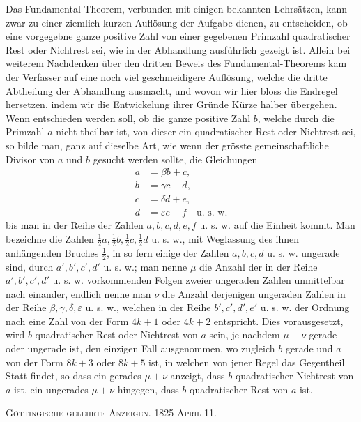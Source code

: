 \documentclass[12pt]{article}
\begin{document}
Das Fundamental-Theorem, verbunden mit einigen bekannten Lehrsätzen, kann zwar zu einer ziemlich kurzen Auflösung der Aufgabe dienen, zu entscheiden, ob eine vorgegebne ganze positive Zahl von einer gegebenen Primzahl quadratischer Rest oder Nichtrest sei, wie in der Abhandlung ausführlich gezeigt ist. Allein bei weiterem Nachdenken über den dritten Beweis des Fundamental-Theorems kam der Verfasser auf eine noch viel geschmeidigere Auflösung, welche die dritte Abtheilung der Abhandlung ausmacht, und wovon wir hier bloss die Endregel hersetzen, indem wir die Entwickelung ihrer Gründe Kürze halber übergehen. Wenn entschieden werden soll, ob die ganze positive Zahl $b$, welche durch die Primzahl $a$ nicht theilbar ist, von dieser ein quadratischer Rest oder Nichtrest sei, so bilde man, ganz auf dieselbe Art, wie wenn der grösste gemeinschaftliche Divisor von $a$ und $b$ gesucht werden sollte, die Gleichungen
\[
\begin{aligned}
a&=\beta b+c,\\
b&=\gamma c+d,\\
c&=\delta d+e,\\
d&=\varepsilon e+f\quad\text{u. s. w.}
\end{aligned}
\]
bis man in der Reihe der Zahlen $a,b,c,d,e,f$ u. s. w. auf die Einheit kommt. Man bezeichne die Zahlen $\frac12a,\frac12b,\frac12c,\frac12d$ u. s. w., mit Weglassung des ihnen anhängenden Bruches $\frac12$, in so fern einige der Zahlen $a,b,c,d$ u. s. w. ungerade sind, durch $a',b',c',d'$ u. s. w.; man nenne $\mu$ die Anzahl der in der Reihe $a',b',c',d'$ u. s. w. vorkommenden Folgen zweier ungeraden Zahlen unmittelbar nach einander, endlich nenne man $\nu$ die Anzahl derjenigen ungeraden Zahlen in der Reihe $\beta,\gamma,\delta,\varepsilon$ u. s. w., welchen in der Reihe $b',c',d',e'$ u. s. w. der Ordnung nach eine Zahl von der Form $4k+1$ oder $4k+2$ entspricht. Dies vorausgesetzt, wird $b$ quadratischer Rest oder Nichtrest von $a$ sein, je nachdem $\mu+\nu$ gerade oder ungerade ist, den einzigen Fall ausgenommen, wo zugleich $b$ gerade und $a$ von der Form $8k+3$ oder $8k+5$ ist, in welchen von jener Regel das Gegentheil Statt findet, so dass ein gerades $\mu+\nu$ anzeigt, dass $b$ quadratischer Nichtrest von $a$ ist, ein ungerades $\mu+\nu$ hingegen, dass $b$ quadratischer Rest von $a$ ist.

\begin{center}
\textsc{Göttingische gelehrte Anzeigen. 1825 April 11.}
\end{center}
\end{document}
